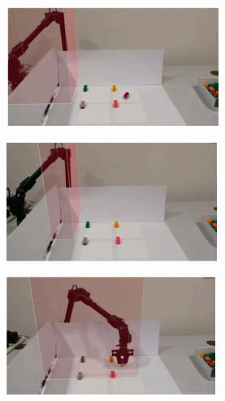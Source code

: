 \begin{enumerate}
    \begin{figure}[htp]
        \centering
        \begin{subfigure}{.5\textwidth}
            \centering
            \includegraphics[width=0.9\linewidth]{figs/a-work-env.png}
            \caption{}
            \label{fig:sfig1}
        \end{subfigure}%
        \begin{subfigure}{.5\textwidth}
            \centering
            \includegraphics[width=0.9\linewidth]{figs/b-work-env.png}
            \caption{}
            \label{fig:sfig2}
        \end{subfigure}
        \begin{subfigure}{.5\textwidth}
            \centering
            \includegraphics[width=0.9\linewidth]{figs/c-work-env.png}

\end{subfigure}
\end{figure}
\end{enumerate}
